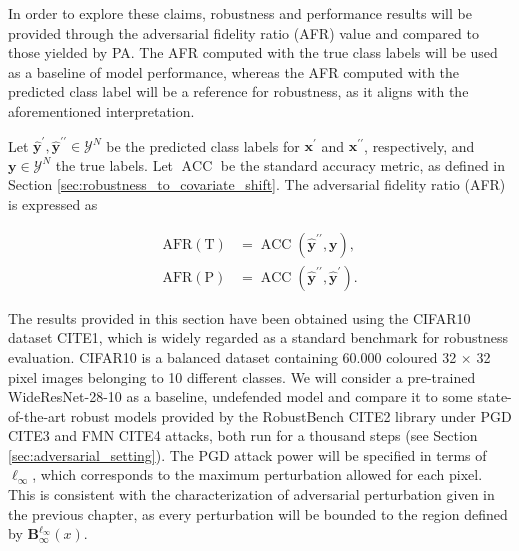 In order to explore these claims, robustness and performance results will be
provided through the adversarial fidelity ratio (AFR) value and compared to those
yielded by PA. The AFR computed with the true class labels will be used as a baseline
of model performance, whereas the AFR computed with the predicted class label
will be a reference for robustness, as it aligns with the aforementioned
interpretation.

\begin{definition}
    Let $\bm{\hat{y}^\prime}, \bm{\hat{y}^{\prime\prime}} \in \mathcal{Y}^N$ be the predicted class 
    labels for $\bm{x}^\prime$ and $\bm{x}^{\prime \prime}$, respectively, 
    and $\bm{y}\in \mathcal{Y}^N$ the true labels. Let $\operatorname{ACC}$ be the standard accuracy 
    metric, as defined in Section \ref{sec:robustness_to_covariate_shift}.
    The adversarial fidelity ratio (AFR) is expressed as

    $$
    \begin{aligned}
        \operatorname{AFR (T)} &= \operatorname{ACC}(\bm{\hat{y}^{\prime \prime}}, \bm{y}), \\
        \operatorname{AFR (P)} &= \operatorname{ACC}(\bm{\hat{y}^{\prime \prime}}, \bm{\hat{y}^{\prime}}).
    \end{aligned}
    $$

\end{definition}

The results provided in this section have been obtained using the CIFAR10 dataset CITE1,
which is widely regarded as a standard benchmark for robustness evaluation. CIFAR10 is
a balanced dataset containing 60.000 coloured 32 $\times$ 32 pixel images belonging to 10
different classes. We will consider a pre-trained WideResNet-28-10 as a baseline, undefended
model and compare it to some state-of-the-art robust models provided by the 
RobustBench CITE2
library under PGD CITE3
and FMN CITE4
attacks, both run for a thousand steps (see Section \ref{sec:adversarial_setting}). 
The PGD attack power will be specified in terms of $\ell_\infty$, which corresponds
to the maximum perturbation allowed for each pixel. This is consistent with the characterization
of adversarial perturbation given in the previous chapter, as every perturbation will be bounded
to the region defined by $\mathbf{B}_\infty^{\ell_{\infty}} (x)$.

